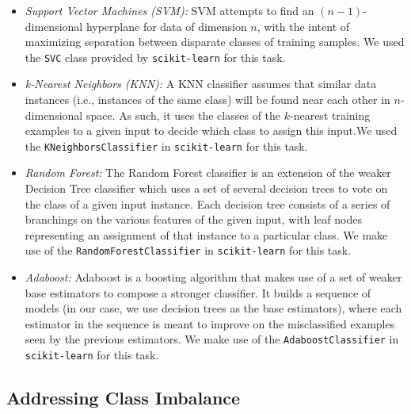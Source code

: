 \documentclass[conference]{IEEEtran}
\begin{document}
\begin{itemize}
\item \textit{Support Vector Machines (SVM):} SVM attempts to find an $(n-1)$-dimensional hyperplane for data of dimension $n$, with the intent
of maximizing separation between disparate classes of training samples. We used the \texttt{SVC} class provided by \texttt{scikit-learn} for this task.\\
\item \textit{k-Nearest Neighbors (KNN):} A KNN classifier assumes that similar data instances (i.e., instances of the same class) will be found near each other
in $n$-dimensional space. As such, it uses the classes of the $k$-nearest training examples to a given input to decide which class to assign this input.We used the
\texttt{KNeighborsClassifier} in \texttt{scikit-learn} for this task.\\
\item \textit{Random Forest:} The Random Forest classifier is an extension of the weaker Decision Tree classifier which uses a set of several decision trees to vote
on the class of a given input instance. Each decision tree consists of a series of branchings on the various features of the given input, with leaf nodes representing an
assignment of that instance to a particular class. We make use of the \texttt{RandomForestClassifier} in \texttt{scikit-learn} for this task.\\
\item \textit{Adaboost:} Adaboost is a boosting algorithm that makes use of a set of weaker base estimators to compose a stronger classifier. It builds a sequence of 
models (in our case, we use decision trees as the base estimators), where each estimator in the sequence is meant to improve on the misclassified examples seen 
by the previous estimators. We make use of the \texttt{AdaboostClassifier} in \texttt{scikit-learn} for this task.\\
\end{itemize}

\subsection{Addressing Class Imbalance}
\end{document}
